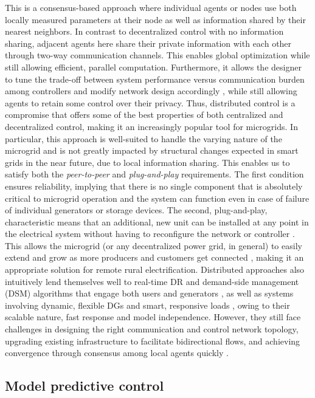 \documentclass[final,3p,times]{elsarticle}
\begin{document}
This is a consensus-based approach where individual agents or nodes use both locally measured parameters at their node as well as information shared by their nearest neighbors. In contrast to decentralized control with no information sharing, adjacent agents here share their private information with each other through two-way communication channels. This enables global optimization while still allowing efficient, parallel computation. Furthermore, it allows the designer to tune the trade-off between system performance versus communication burden among controllers and modify network design accordingly \cite{farina2012}, while still allowing agents to retain some control over their privacy. Thus, distributed control is a compromise that offers some of the best properties of both centralized and decentralized control, making it an increasingly popular tool for microgrids. In particular, this approach is well-suited to handle the varying nature of the microgrid and is not greatly impacted by structural changes expected in smart grids in the near future, due to local information sharing. This enables us to satisfy both the \textit{peer-to-peer} and \textit{plug-and-play} requirements. The first condition ensures reliability, implying that there is no single component that is absolutely critical to microgrid operation and the system can function even in case of failure of individual generators or storage devices. The second, plug-and-play, characteristic means that an additional, new unit can be installed at any point in the electrical system without having to reconfigure the network or controller \cite{mg_prop}. This allows the microgrid (or any decentralized power grid, in general) to easily extend and grow as more producers and customers get connected \cite{pourbabak2017}, making it an appropriate solution for remote rural electrification. Distributed approaches also intuitively lend themselves well to real-time DR and demand-side management (DSM) algorithms that engage both users and generators \cite{deng2014}, as well as systems involving dynamic, flexible DGs and smart, responsive loads \cite{dist_1, dist_2}, owing to their scalable nature, fast response and model independence. However, they still face challenges in designing the right communication and control network topology, upgrading existing infrastructure to facilitate bidirectional flows, and achieving convergence through consensus among local agents quickly \cite{pourbabak2017}.

\subsection{Model predictive control \label{app:mpc}}
\end{document}
